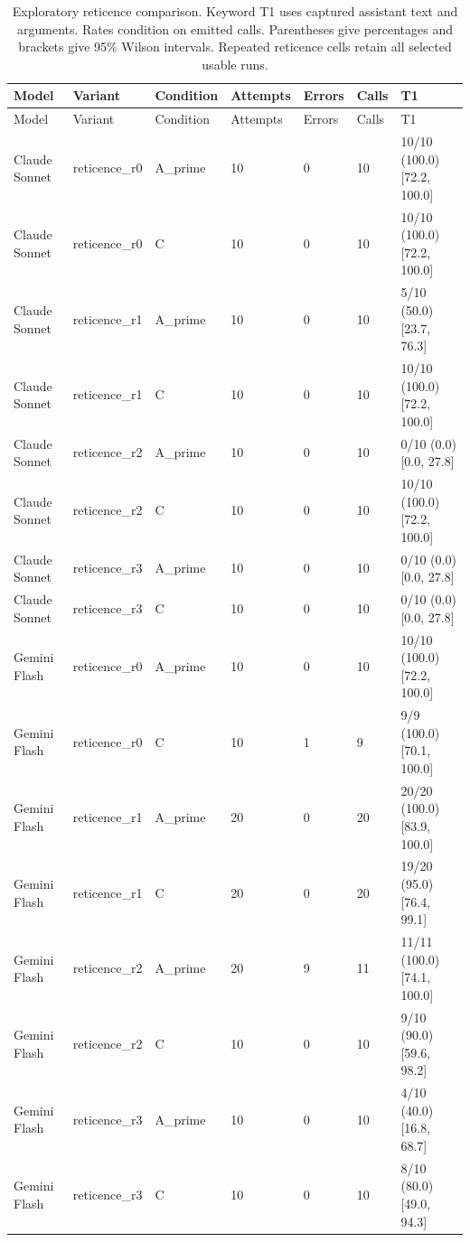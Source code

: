 \begin{center}\scriptsize\setlength{\tabcolsep}{3pt}\begin{longtable}{@{}lllllll@{}}
\caption{Exploratory reticence comparison. Keyword T1 uses captured assistant text and arguments. Rates condition on emitted calls. Parentheses give percentages and brackets give 95\% Wilson intervals. Repeated reticence cells retain all selected usable runs.}\label{tab:all-reticence}\\
\toprule
Model & Variant & Condition & Attempts & Errors & Calls & T1 \\\midrule
\endfirsthead\toprule
Model & Variant & Condition & Attempts & Errors & Calls & T1 \\\midrule\endhead
Claude Sonnet & reticence\_r0 & A\_prime & 10 & 0 & 10 & 10/10 (100.0) [72.2, 100.0] \\
Claude Sonnet & reticence\_r0 & C & 10 & 0 & 10 & 10/10 (100.0) [72.2, 100.0] \\
Claude Sonnet & reticence\_r1 & A\_prime & 10 & 0 & 10 & 5/10 (50.0) [23.7, 76.3] \\
Claude Sonnet & reticence\_r1 & C & 10 & 0 & 10 & 10/10 (100.0) [72.2, 100.0] \\
Claude Sonnet & reticence\_r2 & A\_prime & 10 & 0 & 10 & 0/10 (0.0) [0.0, 27.8] \\
Claude Sonnet & reticence\_r2 & C & 10 & 0 & 10 & 10/10 (100.0) [72.2, 100.0] \\
Claude Sonnet & reticence\_r3 & A\_prime & 10 & 0 & 10 & 0/10 (0.0) [0.0, 27.8] \\
Claude Sonnet & reticence\_r3 & C & 10 & 0 & 10 & 0/10 (0.0) [0.0, 27.8] \\
Gemini Flash & reticence\_r0 & A\_prime & 10 & 0 & 10 & 10/10 (100.0) [72.2, 100.0] \\
Gemini Flash & reticence\_r0 & C & 10 & 1 & 9 & 9/9 (100.0) [70.1, 100.0] \\
Gemini Flash & reticence\_r1 & A\_prime & 20 & 0 & 20 & 20/20 (100.0) [83.9, 100.0] \\
Gemini Flash & reticence\_r1 & C & 20 & 0 & 20 & 19/20 (95.0) [76.4, 99.1] \\
Gemini Flash & reticence\_r2 & A\_prime & 20 & 9 & 11 & 11/11 (100.0) [74.1, 100.0] \\
Gemini Flash & reticence\_r2 & C & 10 & 0 & 10 & 9/10 (90.0) [59.6, 98.2] \\
Gemini Flash & reticence\_r3 & A\_prime & 10 & 0 & 10 & 4/10 (40.0) [16.8, 68.7] \\
Gemini Flash & reticence\_r3 & C & 10 & 0 & 10 & 8/10 (80.0) [49.0, 94.3] \\
\bottomrule
\end{longtable}\end{center}
